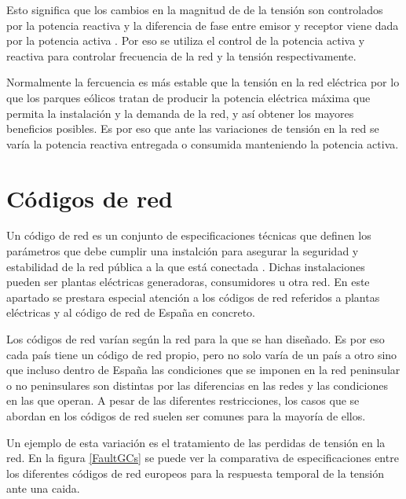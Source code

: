 \documentclass{book}
\begin{document}
Esto significa que los cambios en la magnitud de de la tensi\'on son controlados por la potencia reactiva y la  diferencia de fase entre emisor y receptor viene dada por la potencia activa \cite{WFgridcode}. Por eso se utiliza el control de la potencia activa y reactiva para controlar frecuencia de la red y la tensi\'on respectivamente. \par

Normalmente la fercuencia es m\'as estable que la tensi\'on en la red el\'ectrica por lo que los parques e\'olicos tratan de producir la potencia el\'ectrica m\'axima que permita la instalaci\'on y la demanda de la red, y as\'i obtener los mayores beneficios posibles. Es por eso que ante las variaciones de tensi\'on en la red se var\'ia la potencia reactiva entregada o consumida manteniendo la potencia activa. \par


	\section{C\'odigos de red}

Un c\'odigo de red es un conjunto de especificaciones t\'ecnicas que definen los par\'ametros que debe cumplir una instalci\'on para asegurar la seguridad y estabilidad de la red p\'ublica a la que est\'a conectada  \cite{UKgridCode}. Dichas instalaciones pueden ser plantas el\'ectricas generadoras, consumidores u otra red. En este apartado se prestara especial atenci\'on a los c\'odigos de red referidos a plantas el\'ectricas y al c\'odigo de red de España en concreto. \par

Los c\'odigos de red var\'ian seg\'un la red para la que se han diseñado. Es por eso cada pa\'is tiene un c\'odigo de red propio, pero no solo var\'ia de un pa\'is a otro sino que incluso dentro de España las condiciones que se imponen en la red peninsular o no peninsulares son distintas por las diferencias en las redes y las condiciones en las que operan. A pesar de las diferentes restricciones, los casos que se abordan en los c\'odigos de red suelen ser comunes para la mayor\'ia de ellos.  \par

Un ejemplo de esta variaci\'on es el tratamiento de las perdidas de tensi\'on en la red. En la figura \ref{FaultGCs} se puede ver la comparativa de especificaciones entre los diferentes c\'odigos de red europeos para la respuesta temporal de la tensi\'on ante una caida. \par
\end{document}
